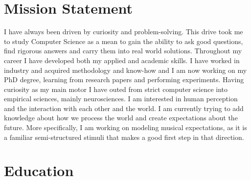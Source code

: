 \documentclass[a4paper]{deedy-resume} %
\begin{document}




\section{Mission Statement}

\begin{flushleft}
I have always been driven by curiosity and problem-solving. This drive took me
to study Computer Science as a mean to gain the ability to ask good
questions, find rigorous answers and carry them into real world solutions.
Throughout my career I have developed both my applied and academic skills. I
have worked in industry and acquired methodology and know-how and I am now
working on my PhD degree, learning from research papers and performing
experiments. Having curiosity as my main motor I have outed from strict
computer science into empirical sciences, mainly neurosciences. I am
interested in human perception and the interaction with each other and the
world. I am currently trying to add knowledge about how we process the world
and create expectations about the future. More specifically, I am working on
modeling musical expectations, as it is a familiar
semi-structured stimuli that makes a good first step in that direction.
\end{flushleft}


\section{Education} 
\end{document}
